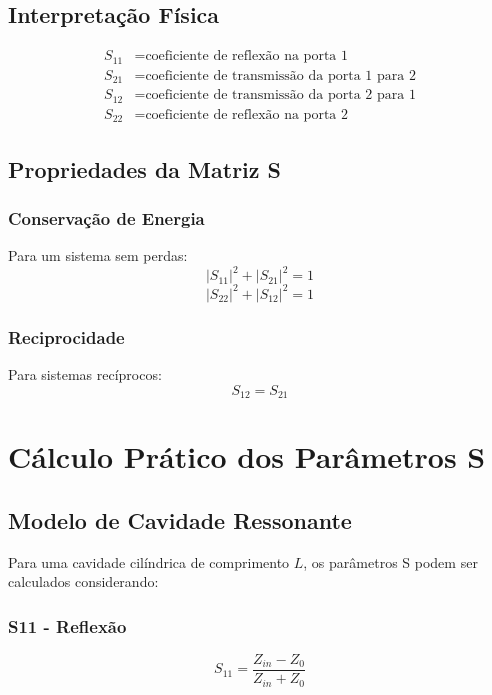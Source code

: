 \documentclass[a4paper,12pt]{article}
\begin{document}
\subsection{Interpretação Física}
\begin{align}
S_{11} &= \text{coeficiente de reflexão na porta 1} \\
S_{21} &= \text{coeficiente de transmissão da porta 1 para 2} \\
S_{12} &= \text{coeficiente de transmissão da porta 2 para 1} \\
S_{22} &= \text{coeficiente de reflexão na porta 2}
\end{align}

\subsection{Propriedades da Matriz S}

\subsubsection{Conservação de Energia}
Para um sistema sem perdas:
\begin{equation}
|S_{11}|^2 + |S_{21}|^2 = 1
\end{equation}
\begin{equation}
|S_{22}|^2 + |S_{12}|^2 = 1
\end{equation}

\subsubsection{Reciprocidade}
Para sistemas recíprocos:
\begin{equation}
S_{12} = S_{21}
\end{equation}

\section{Cálculo Prático dos Parâmetros S}

\subsection{Modelo de Cavidade Ressonante}
Para uma cavidade cilíndrica de comprimento $L$, os parâmetros S podem ser calculados considerando:

\subsubsection{S11 - Reflexão}
\begin{equation}
S_{11} = \frac{Z_{in} - Z_0}{Z_{in} + Z_0}
\end{equation}
\end{document}
